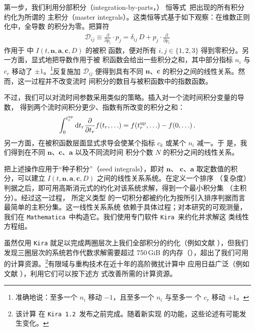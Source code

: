 第一步，我们利用分部积分（integration-by-parts，）
恒等式\,\cite{Tkachov:1981wb,Chetyrkin:1981qh} 把出现的所有积分约化为所谓的
主积分（master integrals）。这类恒等式基于如下观察：在维数正则化中，全导数
的积分为零。把算符
\begin{equation}
  \begin{split}
    \mathcal{D}_{ij} \equiv \frac{\partial}{\partial p_i}\cdot p_j =
    \delta_{ij}\,D+ p_j\cdot \frac{\partial}{\partial p_i}
    \label{eq:dij}
  \end{split}
\end{equation}
作用于  中 $I(t,\mathbf{n},\mathbf{a},\mathbf{c},D)$ 的被积
函数，便对所有 $i,j\in\{1,2,3\}$ 得到零积分。另一方面，显式地把导数作用于被
积函数会给出一些积分之和，其中部分指标 $n_i$ 与 $c_r$ 移动了 $\pm
1$。\footnote{准确地说：至多一个 $n_i$ 移动 $-1$，且至多一个 $n_i$ 与至多一
  个 $c_r$ 移动 $+1$。}反复施加 $\mathcal{D}_{ij}$ 便得到具有不同
$\mathbf{n}$、$\mathbf{c}$ 的积分之间的线性关系。然而，这一过程并不改变流时
间积分的数目与被积函数中的指数函数。

不过，我们可以对流时间参数采用类似的策略。插入对一个流时间积分变量的导数，
得到两个流时间积分更少、指数有所改变的积分之和：
\begin{equation}
  \int_0^{t_{r}^\text{up}}{\rm d} t_r \frac{\partial }{\partial t_r} f(t_r,\ldots) = f(t_{r}^\text{up},\ldots)-f(0,\ldots)\,.
  \label{eq:ibpflow}
\end{equation}
另一方面，在被积函数层面显式求导会使某个指标 $c_k$ 或某个 $n_i$ 减一。于
是，我们得到在不同 $\mathbf{n}$、$\mathbf{c}$、$\mathbf{a}$ 以及不同流时间
积分个数 $N$ 的积分之间的线性关系。

把上述操作应用于``种子积分''（seed integrals），即对 $\mathbf{n}$、
$\mathbf{c}$、$\mathbf{a}$ 取定数值的积分，可以建立
$I(t,\mathbf{n},\mathbf{a},\mathbf{c},D)$ 之间的线性关系系统。在定义一个排序
（复杂度）判据之后，即可用高斯消元式的约化对该系统求解，得到一个最小积分集
（主积分）\cite{Laporta:2001dd}。经过这一过程， 所定义类型
的一切积分都被约化为按所引入排序判据而言最简单的主积分集。这一线性关系系统
依赖于具体过程；对本研究的可观测量，我们在
\texttt{Mathematica}\,\cite{Mathematica11.3} 中构造它。我们使用专门软件
\texttt{Kira}\,\cite{Maierhoefer:2017hyi,Maierhofer:2018gpa} 来约化并求解这
类线性方程组。

虽然仅用 \texttt{Kira} 就足以完成两圈层次上我们全部积分的约化（例如文献
），但我们发现三圈层次的系统若作代数求解需要超过
750\,GiB 的内存（），超出了我们可用的计算资源。\footnote{该计算
  在 \texttt{Kira 1.2}\,\cite{Maierhofer:2018gpa} 发布之前完成。随着新实现
  的功能，这些论述有可能发生变化。}有限域与重构技术在近十年的高阶微扰计算中
应用日益广泛（例如文献
），利用它们可以按下述方
式改善所需的计算资源。


